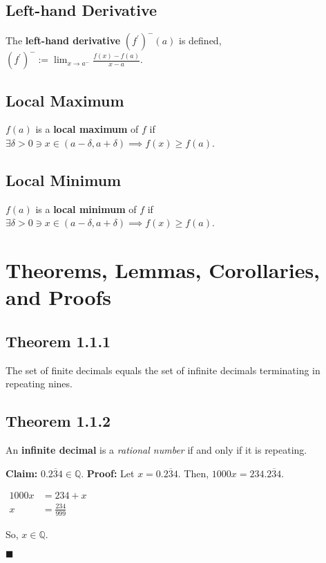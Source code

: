 \documentclass[11pt]{book}
\newcommand{\Q}{\mathbb{Q}}
\newcommand{\QED}{\begin{flushright}$\blacksquare$\end{flushright}}
\begin{document}
	\subsection{Left-hand Derivative}
	\label{subsec:lhderivative}
	\begin{defin}
		The \textbf{left-hand derivative} $(f^{\prime})^-(a)$ is defined, $(f^{\prime})^- := \displaystyle\lim_{x \to a^-}{\frac{f(x) - f(a)}{x - a}}$.
	\end{defin}
	\subsection{Local Maximum}
	\label{subsec:localmaximum}
		\begin{defin}
			$f(a)$ is a \textbf{local maximum} of $f$ if $\exists \delta > 0 \ni x \in (a-\delta,a+\delta) \implies f(x) \geq f(a)$.
		\end{defin}
	\subsection{Local Minimum}
	\label{subsec:locaminimum}
		\begin{defin}
			$f(a)$ is a \textbf{local minimum} of $f$ if $\exists \delta > 0 \ni x \in (a-\delta,a+\delta) \implies f(x) \geq f(a)$.
		\end{defin}
\section{Theorems, Lemmas, Corollaries, and Proofs}
	\subsection{Theorem 1.1.1}
		\begin{theor} 
			The set of finite decimals equals the set of infinite decimals terminating in repeating nines.
		\end{theor}
	\subsection{Theorem 1.1.2}
		\begin{theor}
			An \textbf{infinite decimal} is a \emph{rational number} if and only if it is repeating.
		\end{theor}

		\begin{examp}
			\textbf{Claim:} 0.$\overline{234} \in \Q$.\hfill\break
			\textbf{Proof:} Let $x = 0.\overline{234}$. Then, $1000x = 234.\overline{234}$.
			\begin{center}
				\begin{math}
					\begin{aligned}
				1000x & = 234 + x\\
				x & = \frac{234}{999}
					\end{aligned}	
				\end{math}
			\end{center}
			So, $x \in \Q$. \QED
		\end{examp}
\end{document}
